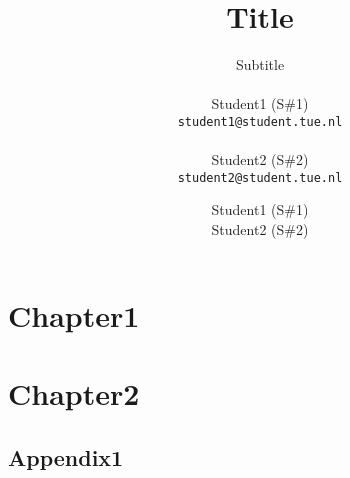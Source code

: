 \documentclass[11pt,a4paper]{report}
\title{Title}
\subtitle{Subtitle \\~\\ \small{Student1\tabto*{7em} (S\#1)\\ \texttt{student1@student.tue.nl} \\~\\ Student2\tabto*{7em} (S\#2)\\ \texttt{student2@student.tue.nl}}}
\author{Student1\tabto*{6em} (S\#1) \\ Student2\tabto*{6em} (S\#2)}
\begin{document}
\maketitle
\tableofcontents



\chapter{Chapter1}
% 

\chapter{Chapter2}
% 

\begin{appendices}

\chapter{Appendix1}
% 

\end{appendices}
\end{document}
